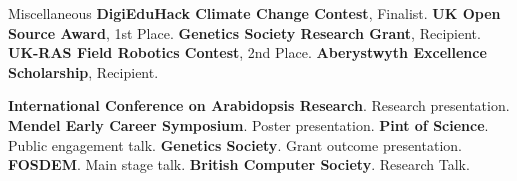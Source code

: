 \begin{rubric}{Miscellaneous}
\entry*[2022] \textbf{DigiEduHack Climate Change Contest}, Finalist.
\entry*[2019] \textbf{UK Open Source Award}, 1st Place.
\entry*[2017] \textbf{Genetics Society Research Grant}, Recipient.
\entry*[2016] \textbf{UK-RAS Field Robotics Contest}, 2nd Place.
\entry*[2014] \textbf{Aberystwyth Excellence Scholarship}, Recipient.


\entry*[2022] \textbf{International Conference on Arabidopsis Research}.
Research presentation.
\entry*[2022] \textbf{Mendel Early Career Symposium}.
Poster presentation.
\entry*[2022] \textbf{Pint of Science}.
Public engagement talk.
\entry*[2018] \textbf{Genetics Society}. Grant outcome presentation.
\entry*[2017] \textbf{FOSDEM}. Main stage talk.
\entry*[2017] \textbf{British Computer Society}. Research Talk.



\end{rubric}